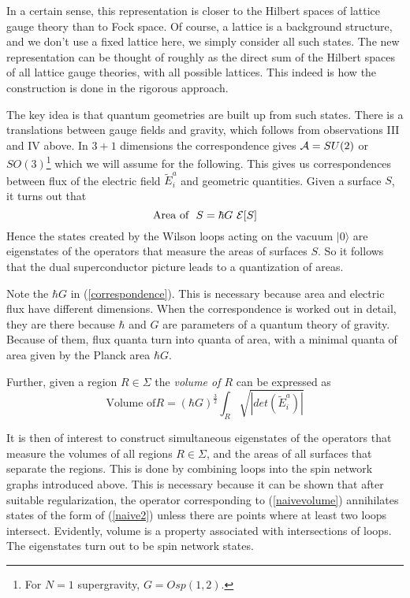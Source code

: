 \documentclass[12pt]{article}
\newcommand{\f}{\begin{equation}}
\newcommand{\ff}{\end{equation}}
\begin{document}
In a certain sense, this representation is closer to the Hilbert spaces of
lattice gauge theory than to Fock space.    Of 
course, a lattice is a background structure, and we don't use a fixed 
lattice here, we simply consider all such states. The new representation
can be thought of roughly as the direct sum of the Hilbert spaces of 
all lattice gauge theories, with 
all possible lattices.  This indeed is how the construction is done in
the rigorous approach.


The key idea is that quantum geometries are built up from such 
states.  There is a translations between gauge fields and 
gravity, which follows from observations III and IV above.   In $3+1$ dimensions the
correspondence gives
${\cal A}=SU(2)$ or $SO(3)$\footnote{For $N=1$ supergravity, $G= Osp(1,2)$.} which 
we will assume for the following.
This gives us  correspondences between flux of the electric field
$\tilde{E}^a_i$ and geometric quantities. Given a surface $S$, it 
turns out that
\f
\mbox{Area of } \ S =  \hbar G \  {\cal E}[S]
\label{correspondence}
\ff
Hence the states created by the Wilson loops acting on the vacuum
$|0\rangle$ 
are eigenstates  of the operators
that measure the areas of surfaces $S$.
So it follows that the dual superconductor picture leads to a 
quantization of areas.  

Note the $\hbar G$ in  (\ref{correspondence}). This 
is necessary because area and electric flux have different dimensions. 
When the correspondence is worked out in detail, they are there 
because   $\hbar$ and $G$ are parameters of a quantum theory 
of gravity. Because of them, flux quanta turn into quanta of area, 
with a minimal quanta of area given by the Planck area $\hbar G$. 

Further, given a region $R \in \Sigma$ the {\it volume of $R$}  can be
expressed as 
\f
\mbox{Volume of} R = (\hbar G)^{\frac{3}{2}}
\int_R  \sqrt{ |det( \tilde{E}^a_i ) |} 
\label{naivevolume}
\ff

It is then of interest to construct simultaneous eigenstates of the operators that 
measure the volumes of all regions $R \in \Sigma$, and the areas of all surfaces
that separate the regions.  This is done by 
combining loops into the spin network graphs introduced above.  
This is necessary because it can be 
shown that after suitable regularization, the operator corresponding to 
(\ref{naivevolume}) annihilates states of the form of (\ref{naive2})
unless there are points where at least two loops intersect. 
Evidently, volume is a property associated with intersections of 
loops. The eigenstates turn out to be spin network states.  
\end{document}
